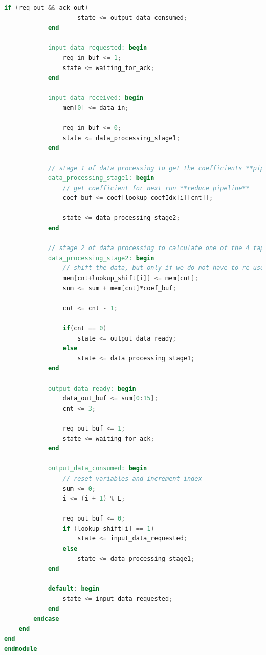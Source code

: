\documentclass[a4paper,twoside,11pt, fleqn]{article}
\begin{document}
\begin{lstlisting}[language=Verilog]
                if (req_out && ack_out)
                    state <= output_data_consumed;
            end

            input_data_requested: begin
                req_in_buf <= 1;
                state <= waiting_for_ack;
            end

            input_data_received: begin
                mem[0] <= data_in;

                req_in_buf <= 0;
                state <= data_processing_stage1;
            end

            // stage 1 of data processing to get the coefficients **pipelining**
            data_processing_stage1: begin
                // get coefficient for next run **reduce pipeline**
                coef_buf <= coef[lookup_coefIdx[i][cnt]];

                state <= data_processing_stage2;
            end

            // stage 2 of data processing to calculate one of the 4 taps
            data_processing_stage2: begin
                // shift the data, but only if we do not have to re-use it once more after this
                mem[cnt+lookup_shift[i]] <= mem[cnt];
                sum <= sum + mem[cnt]*coef_buf;

                cnt <= cnt - 1;

                if(cnt == 0)
                    state <= output_data_ready;
                else
                    state <= data_processing_stage1;
            end

            output_data_ready: begin
                data_out_buf <= sum[0:15];
                cnt <= 3;

                req_out_buf <= 1;
                state <= waiting_for_ack;
            end

            output_data_consumed: begin
                // reset variables and increment index
                sum <= 0;
                i <= (i + 1) % L;

                req_out_buf <= 0;
                if (lookup_shift[i] == 1)
                    state <= input_data_requested;
                else
                    state <= data_processing_stage1; 
            end

            default: begin
                state <= input_data_requested;
            end
        endcase
    end
end
endmodule
\end{lstlisting}
\end{document}
